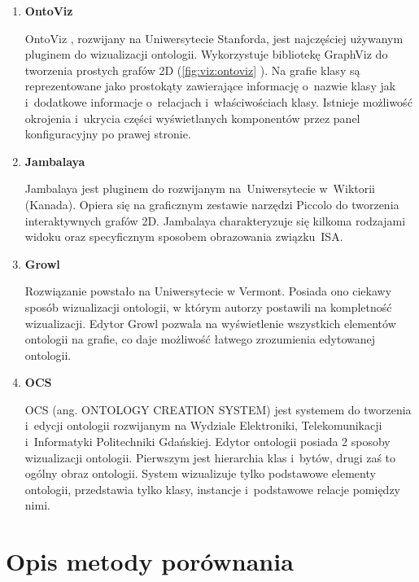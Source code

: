 \begin{enumerate}

 \item{\bf OntoViz}

  \nopagebreak 
 
 OntoViz \cite{OntoViz}, rozwijany na Uniwersytecie Stanforda, jest najczęściej używanym pluginem \proteges do wizualizacji ontologii. Wykorzystuje bibliotekę GraphViz do 
tworzenia prostych grafów 2D (\figurename \space \ref{fig:viz:ontoviz} ). Na grafie klasy są reprezentowane jako prostokąty zawierające informację
 o~nazwie klasy jak i~dodatkowe informacje o~relacjach i~właściwościach klasy. Istnieje możliwość okrojenia i~ukrycia części wyświetlanych komponentów przez 
panel konfiguracyjny po prawej stronie.



 \item{\bf Jambalaya}

  \nopagebreak 
 Jambalaya \cite{Jambalaya,JambalayaProtege} jest pluginem do \proteges rozwijanym na~Uniwersytecie w~Wiktorii (Kanada). Opiera się na graficznym zestawie
 narzędzi Piccolo do tworzenia interaktywnych grafów 2D. Jambalaya charakteryzuje się kilkoma rodzajami widoku oraz specyficznym sposobem obrazowania związku~ISA.

 \item{\bf Growl} \cite{growl}

  \nopagebreak 
Rozwiązanie powstało na Uniwersytecie w Vermont. Posiada ono ciekawy sposób wizualizacji ontologii, w którym autorzy postawili na kompletność wizualizacji. 
Edytor Growl pozwala na wyświetlenie wszystkich elementów ontologii na grafie, co daje możliwość łatwego zrozumienia edytowanej ontologii. 
 \item{\bf OCS}

  \nopagebreak 
  OCS (ang. ONTOLOGY CREATION SYSTEM) \cite{jankowski,boinski} jest systemem do tworzenia i~edycji ontologii rozwijanym na Wydziale Elektroniki, Telekomunikacji i~Informatyki Politechniki
 Gdańskiej. Edytor ontologii posiada 2 sposoby wizualizacji ontologii. Pierwszym jest hierarchia klas i~bytów, drugi zaś to ogólny obraz ontologii. System wizualizuje
 tylko podstawowe elementy ontologii, przedstawia tylko klasy, instancje i~podstawowe relacje pomiędzy nimi. 
 
\end{enumerate}


\section{Opis metody porównania}

